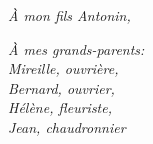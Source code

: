 \begin{flushright}
    \vspace{50mm}
    \textit{À mon fils Antonin,}
    \par \vspace{5mm}
    \textit{À mes grands-parents:\\
        Mireille, ouvrière, \\
        Bernard, ouvrier, \\
        Hélène, fleuriste, \\ 
        Jean, chaudronnier}
\end{flushright}
\clearpage
